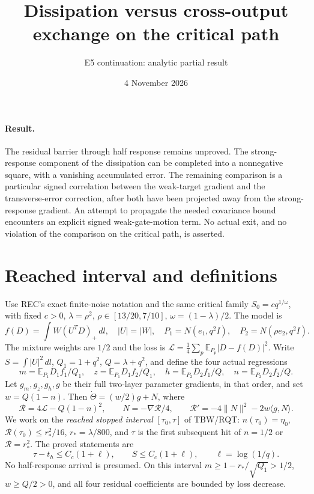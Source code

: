 \documentclass[11pt]{article}
\title{Dissipation versus cross-output exchange on the critical path}
\author{E5 continuation: analytic partial result}
\date{4 November 2026}
\newcommand{\E}{\mathbb E}\newcommand{\dd}{\,d}
\begin{document}
\maketitle

\paragraph{Result.}
The residual barrier through half response remains unproved.
The strong-response component of the dissipation can be completed
into a nonnegative square, with a vanishing accumulated error.
The remaining comparison is a particular signed correlation between
the weak-target gradient and the transverse-error correction, after
both have been projected away from the strong-response gradient.
An attempt to propagate the needed covariance bound encounters an
explicit signed weak-gate-motion term. No actual exit, and no
violation of the comparison on the critical path, is asserted.

\section{Reached interval and definitions}
Use REC's exact finite-noise notation and the same critical family
$S_0=cq^{1/\omega}$, with fixed $c>0$,
$\lambda=\rho^2$, $\rho\in[13/20,7/10]$,
$\omega=(1-\lambda)/2$. The model is
\[
 f(D)=\int W(U^TD)_+\dd l,\quad |U|=|W|,\quad
 P_1=N(e_1,q^2I),\quad P_2=N(\rho e_2,q^2I).
\]
The mixture weights are $1/2$ and the loss is
$\mathcal L=\frac14\sum_p\E_{P_p}|D-f(D)|^2$.
Write $S=\int|U|^2\dd l$, $Q_1=1+q^2$, $Q=\lambda+q^2$,
and define the four actual regressions
\[
 m=\E_{P_1}D_1f_1/Q_1,\quad z=\E_{P_1}D_1f_2/Q_1,\quad
 h=\E_{P_2}D_2f_1/Q,\quad n=\E_{P_2}D_2f_2/Q.
\]
Let $g_m,g_z,g_h,g$ be their full two-layer parameter gradients,
in that order, and set $w=Q(1-n)$.
Then $\dot\Theta=(w/2)g+N$, where
\[
 \mathcal R=4\mathcal L-Q(1-n)^2,\qquad N=-\nabla\mathcal R/4,
 \qquad \mathcal R'=-4\|N\|^2-2w\langle g,N\rangle.
\]
We work on the \emph{reached stopped interval} $[\tau_0,\tau]$
of TBW/RQT: $n(\tau_0)=\eta_0$, $\mathcal R(\tau_0)\le r_*^2/16$,
$r_*=\lambda/800$, and $\tau$ is the first subsequent hit of
$n=1/2$ or $\mathcal R=r_*^2$. The proved statements are
\begin{equation}\label{an04pcdv1:interval}
 \tau-t_h\le C_c(1+\ell),\qquad S\le C_c(1+\ell),
 \qquad \ell=\log(1/q).
\end{equation}
No half-response arrival is presumed. On this interval
$m\ge1-r_*/\sqrt{Q_1}>1/2$, $w\ge Q/2>0$,
and all four residual coefficients are bounded by loss decrease.
\end{document}
